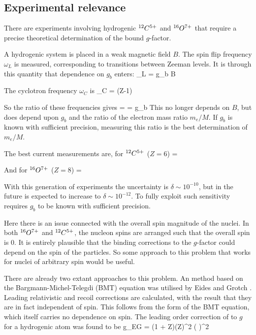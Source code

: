 \subsection{Experimental relevance}
There are experiments involving hydrogenic $^{12}C^{5+}$ and $^{16}O^{7+}$ that require a precise theoretical determination of the bound $g$-factor.


A hydrogenic system is placed in a weak magnetic field $B$.  The spin flip frequency $\omega_L$ is measured, corresponding to transitions between Zeeman levels.  It is through this quantity that dependence on $g_b$ enters:
\beq
	\omega_L = g_b  B
\eeq

The cyclotron frequency $\omega_C$ is
\beq
	\omega_C = (Z-1) 
\eeq

So the ratio of these frequencies gives
\beq
	 =  = 
	g_b  
\eeq
This no longer depends on $B$, but does depend upon $g_b$ and the ratio of the electron mass ratio $m_e/M$.  If $g_b$ is known with sufficient precision, measuring this ratio is the best determination of $m_e/M$.

The best current measurements are, for $^{12}C^{5+}$ ($Z=6$)
\beq
	  = ~~~~~
\eeq

And for $^{16}O^{7+}$ ($Z=8$)
\beq
		  = ~~~~~
\eeq

With this generation of experiments the uncertainty is $\delta \sim 10^{-10}$, but in the future is expected to increase to $\delta \sim 10^{-12}$.  To fully exploit such sensitivity requires $g_b$ to be known with sufficient precision.

Here there is an issue connected with the overall spin magnitude of the nuclei.  In both $^{16}O^{7+}$ and $^{12}C^{5+}$, the nucleon spins are arranged such that the overall spin is $0$.  It is entirely plausible that the binding corrections to the $g$-factor could depend on the spin of the particles.  So some approach to this problem that works for nuclei of arbitrary spin would be useful.

There are already two extant approaches to this problem.  An method based on the Bargmann-Michel-Telegdi (BMT) equation was utilised by Eides and Grotch \cite{Eides:1997sq}.  Leading relativistic and recoil corrections are calculated, with the result that they are in fact independent of spin.  This follows from the form of the BMT equation, which itself carries no dependence on spin.  The leading order correction of to $g$ for a hydrogenic atom was found to be
\beq
	\Delta g_{EG} = (1 + Z)(Z\alpha)^2 \left(  \right )^2
\eeq 

